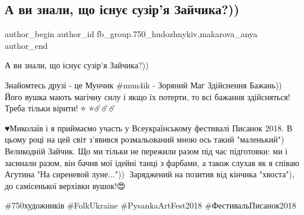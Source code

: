  
 
 
 
 

\subsection{А ви знали, що існує сузір'я Зайчика?))}
\label{sec:02_04_2018.fb.fb_group.750_hudozhnykiv.1.suzirja_zajchika}
 
\ifcmt
 author_begin
   author_id fb_group.750_hudozhnykiv,makarova_anya
 author_end
\fi

А ви знали, що існує сузір'я Зайчика?))

Знайомтесь друзі - це Мунчик \#mun4ik - Зоряний Маг Здійснення Бажань))🐰 Його
вушка мають магічну силу і якщо їх потерти, то всі бажання здійсняться! Треба
тільки вірити!🌟⭐🌟⭐☄️☄️☄️ 

♥️Миколаїв і я приймаємо участь у Всеукраїнському фестивалі Писанок 2018. В
цьому році на цей світ з'явився розмальований мною ось такий "маленький")
Великодній Зайчик. Що ми тільки не пережили разом під час підготовки: ми і
засинали разом, він бачив мої ідейні танці з фарбами, а також слухав як я
співаю Агутина "На сиреневой луне..."))🤣 Заряджений на позитив від кінчика
"хвоста"), до самісенької верхівки вушок!😍🤗

\#750художників \#FolkUkraine \#PysankaArtFest2018 \#ФестивальПисанок2018

